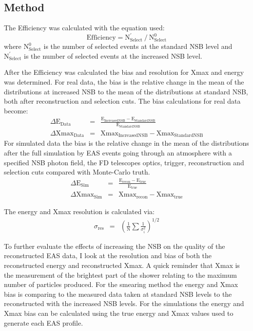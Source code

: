 \subsection{Method}
 The Efficiency was calculated with the equation used:
\begin{equation}
\mathrm{Efficiency} = \mathrm{N}^{'}_{\mathrm{Select}} \ / \ \mathrm{N}^0_{\mathrm{Select}}
\end{equation}
where $\mathrm{N}^{0}_{\mathrm{Select}}$ is the number of selected events at the standard NSB level and $\mathrm{N}^{'}_{\mathrm{Select}}$ is the number of selected events at the increased NSB
level. 

After the Efficiency was calculated the bias and resolution for Xmax and energy was determined. For real data, the bias is the relative change in the mean of the distributions at increased NSB to the mean of the distributions at standard NSB, both after reconstruction and selection cuts. The bias calculations for real data become:
\begin{eqnarray}
\Delta \mathrm{E}_{\mathrm{Data}} &=& \frac{\mathrm{E}_{\mathrm{IncreasedNSB}} - \mathrm{E}_{\mathrm{StandardNSB}}}{\mathrm{E}_{\mathrm{StandardNSB}}} \label{eq:energybias_data} \\
\Delta \mathrm{Xmax}_{\mathrm{Data}} &=& \mathrm{Xmax}_{\mathrm{IncreasedNSB}} - \mathrm{Xmax}_{\mathrm{StandardNSB}}\label{eq:xmaxbias_data}
\end{eqnarray} 
For simulated data the bias is the relative change in the mean of the distributions after the full simulation by EAS events going through an atmosphere with a specified NSB photon field, the FD telescopes optics, trigger, reconstruction and selection cuts compared with Monte-Carlo truth.
\begin{eqnarray}
\Delta \mathrm{E}_{\mathrm{Sim}} &=& \frac{\mathrm{E}_{\mathrm{recon}} - \mathrm{E}_{\mathrm{true}}}{\mathrm{E}_{\mathrm{true}}}  \label{eq:energybias_sim} \\
\Delta \mathrm{Xmax}_{\mathrm{Sim}} &=& \mathrm{Xmax}_{\mathrm{recon}} - \mathrm{Xmax}_{\mathrm{true}} \label{eq:xmaxbias_sim}
\end{eqnarray}
 
 
The energy and Xmax resolution is calculated via:
\begin{eqnarray}
\sigma_{\mathrm{res}} &=& \left( \frac{1}{\mathrm{N}} \sum \frac{1}{\sigma^2_i} \right)^{1/2}
\end{eqnarray}

To further evaluate the effects of increasing the NSB on the quality of the reconstructed EAS data, I look at the resolution and bias of both the reconstructed energy and reconstructed Xmax. A quick reminder that Xmax is the measurement of the brightest part of the shower relating to the maximum number of particles produced. For the smearing method the energy and Xmax bias is comparing to the measured data taken at standard NSB levels to the reconstructed with the increased NSB levels. For the simulations the energy and Xmax bias can be calculated using the true energy and Xmax values used to generate each EAS profile.

